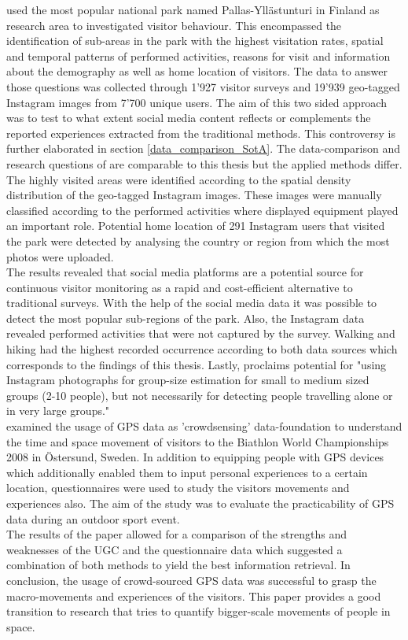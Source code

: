 \textcite{Heikinheimo2017} used the most popular national park named Pallas-Yll\"astunturi in Finland as research area to investigated visitor behaviour. This encompassed the identification of sub-areas in the park with the highest visitation rates, spatial and temporal patterns of performed activities, reasons for visit and information about the demography as well as home location of visitors. The data to answer those questions was collected through 1'927 visitor surveys and 19'939 geo-tagged Instagram images from 7'700 unique users. The aim of this two sided approach was to test to what extent social media content reflects or complements the reported experiences extracted from the traditional methods. This controversy is further elaborated in section \ref{data_comparison_SotA}. The data-comparison and research questions of \textcite{Heikinheimo2017} are comparable to this thesis but the applied methods differ.
The highly visited areas were identified according to the spatial density distribution of the geo-tagged Instagram images. These images were manually classified according to the performed activities where displayed equipment played an important role. Potential home location of 291 Instagram users that visited the park were detected by analysing the country or region from which the most photos were uploaded. \\
The results revealed that social media platforms are a potential source for continuous visitor monitoring as a rapid and cost-efficient alternative to traditional surveys. With the help of the social media data it was possible to detect the most popular sub-regions of the park. Also, the Instagram data revealed performed activities that were not captured by the survey. Walking and hiking had the highest recorded occurrence according to both data sources which corresponds to the findings of this thesis. Lastly, \textcite[p.10]{Heikinheimo2017} proclaims potential for "using Instagram photographs for group-size estimation for small to medium sized groups (2-10 people), but not necessarily for detecting people travelling alone or in very large groups." \\

\textcite{Pettersson2011} examined the usage of GPS data as 'crowdsensing' data-foundation to understand the time and space movement of visitors to the Biathlon World Championships 2008 in \"Ostersund, Sweden. In addition to equipping people with GPS devices which additionally enabled them to input personal experiences to a certain location, questionnaires were used to study the visitors movements and experiences also. The aim of the study was to evaluate the practicability of GPS data during an outdoor sport event. \\
The results of the paper allowed for a comparison of the strengths and weaknesses of the UGC and the questionnaire data which suggested a combination of both methods to yield the best information retrieval. In conclusion, the usage of crowd-sourced GPS data was successful to grasp the macro-movements and experiences of the visitors. This paper provides a good transition to research that tries to quantify bigger-scale movements of people in space.

